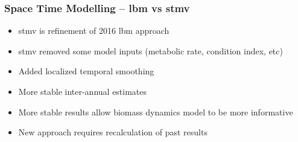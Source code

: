 \documentclass{beamer}
\numberwithin{equation}{section}		%
\numberwithin{figure}{section}	   	%
\numberwithin{table}{section}				%
\begin{document}

\begin{frame}
\frametitle{Space Time Modelling -- lbm vs stmv }


		\vspace*{-.5cm}
		\begin{itemize}
		\item stmv is refinement of 2016 lbm approach
		\item stmv removed some model inputs (metabolic rate, condition index, etc)
		\item Added localized temporal smoothing
		\item More stable inter-annual estimates
		\item More stable results allow biomass dynamics model to be more informative
		\item New approach requires recalculation of past results
		\end{itemize}


\end{frame}
\end{document}
